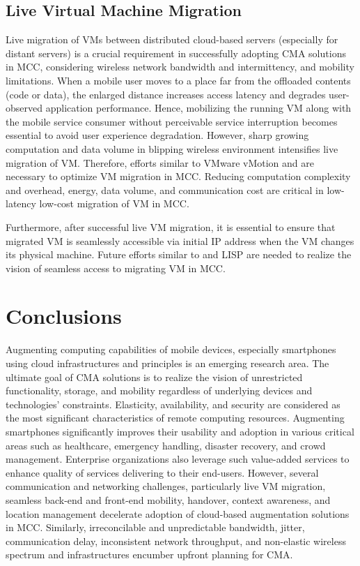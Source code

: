 \documentclass[publish]{IEEEtran}
\begin{document}
\subsection{Live Virtual Machine Migration}
Live migration of VMs between distributed cloud-based servers (especially for distant servers) is a crucial requirement in successfully adopting CMA solutions in MCC, considering wireless network bandwidth and intermittency, and mobility limitations. When a mobile user moves to a place far from the offloaded contents (code or data), the enlarged distance increases access latency and degrades user-observed application performance. Hence, mobilizing the running VM along with the mobile service consumer without perceivable service interruption becomes essential to avoid user experience degradation. However, sharp growing computation and data volume in blipping wireless environment intensifies live migration of VM. Therefore, efforts similar to VMware vMotion \cite{VMWARECOMPARISION} and \cite{Liu2011_VM, Takahashi2012} are necessary to optimize VM migration in MCC. Reducing computation complexity and overhead, energy, data volume, and communication cost are critical in low-latency low-cost migration of VM in MCC.

Furthermore, after successful live VM migration, it is essential to ensure that migrated VM is seamlessly accessible via initial IP address when the VM changes its physical machine. Future efforts similar to \cite{Watanabe2010, Harney2007} and LISP \cite{Raad2013} are needed to realize the vision of seamless access to migrating VM in MCC.

\section{Conclusions} \label{conclusions}
Augmenting computing capabilities of mobile devices, especially smartphones using cloud infrastructures and principles is an emerging research area. The ultimate goal of CMA solutions is to realize the vision of unrestricted functionality, storage, and mobility regardless of underlying devices and technologies' constraints. Elasticity, availability, and security are considered as the most significant characteristics of remote computing resources. Augmenting smartphones significantly improves their usability and adoption in various critical areas such as healthcare, emergency handling, disaster recovery, and crowd management. Enterprise organizations also leverage such value-added services to enhance quality of services delivering to their end-users. However, several communication and networking challenges, particularly live VM migration, seamless back-end and front-end mobility, handover, context awareness, and location management decelerate adoption of cloud-based augmentation solutions in MCC. Similarly, irreconcilable and unpredictable bandwidth, jitter, communication delay, inconsistent network throughput, and non-elastic wireless spectrum and infrastructures encumber upfront planning for CMA.
\end{document}

